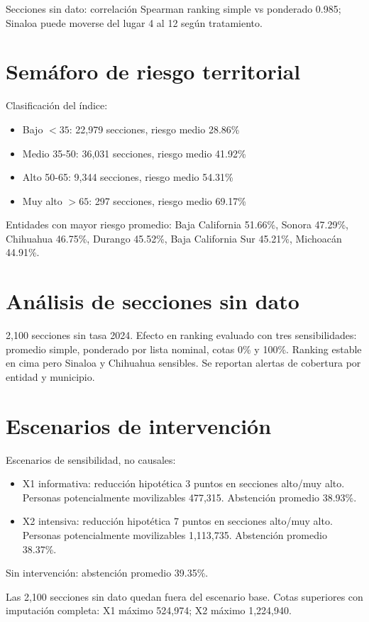 \documentclass[12pt,a4paper]{article}
\begin{document}
Secciones sin dato: correlación Spearman ranking simple vs ponderado 0.985; Sinaloa puede moverse del lugar 4 al 12 según tratamiento.

\section{Semáforo de riesgo territorial}
Clasificación del índice:
\begin{itemize}
\item Bajo $<35$: 22,979 secciones, riesgo medio 28.86\%
\item Medio 35-50: 36,031 secciones, riesgo medio 41.92\%
\item Alto 50-65: 9,344 secciones, riesgo medio 54.31\%
\item Muy alto $>65$: 297 secciones, riesgo medio 69.17\%
\end{itemize}

Entidades con mayor riesgo promedio: Baja California 51.66\%, Sonora 47.29\%, Chihuahua 46.75\%, Durango 45.52\%, Baja California Sur 45.21\%, Michoacán 44.91\%.

\section{Análisis de secciones sin dato}
2,100 secciones sin tasa 2024. Efecto en ranking evaluado con tres sensibilidades: promedio simple, ponderado por lista nominal, cotas 0\% y 100\%. Ranking estable en cima pero Sinaloa y Chihuahua sensibles. Se reportan alertas de cobertura por entidad y municipio.

\section{Escenarios de intervención}
Escenarios de sensibilidad, no causales:
\begin{itemize}
\item X1 informativa: reducción hipotética 3 puntos en secciones alto/muy alto. Personas potencialmente movilizables 477,315. Abstención promedio 38.93\%.
\item X2 intensiva: reducción hipotética 7 puntos en secciones alto/muy alto. Personas potencialmente movilizables 1,113,735. Abstención promedio 38.37\%.
\end{itemize}
Sin intervención: abstención promedio 39.35\%.

Las 2,100 secciones sin dato quedan fuera del escenario base. Cotas superiores con imputación completa: X1 máximo 524,974; X2 máximo 1,224,940.
\end{document}
